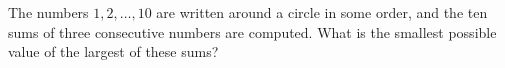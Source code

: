 The numbers $1,2,\dots,10$ are written around a circle in some order, and the ten sums of three consecutive numbers are computed. What is the smallest possible value of the largest of these sums?

